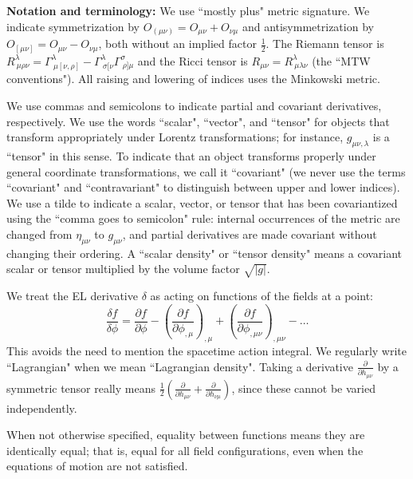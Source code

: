 \documentclass[aps,physrev,preprint,groupedaddress]{revtex4-2}
\begin{document}
\textbf{Notation and terminology:} We use ``mostly plus" metric signature.  We indicate symmetrization by \(O_{(\mu\nu)}=O_{\mu\nu}+O_{\nu\mu}\) and antisymmetrization by \(O_{[\mu\nu]}=O_{\mu\nu}-O_{\nu\mu}\), both without an implied factor \(\frac{1}{2}\).  The Riemann tensor is \(R_   {\ \mu\rho\nu}^\lambda=\Gamma_{\ \mu[\nu,\rho]}^\lambda-\Gamma_{\ \sigma[\nu}^\lambda \Gamma_{\ \rho]\mu}^\sigma\) and the Ricci tensor is \(R_{\mu\nu}=R_{\ \mu\lambda\nu}^\lambda\) (the ``MTW conventions"\cite{MTW}). All raising and lowering of indices uses the Minkowski metric. 

We use commas and semicolons to indicate partial and covariant derivatives, respectively. We use the words ``scalar", ``vector", and ``tensor" for objects that transform appropriately under Lorentz transformations; for instance, \(g_{\mu\nu,\lambda}\) is a ``tensor" in this sense. To indicate that an object transforms properly under general coordinate transformations, we call it ``covariant" (we never use the terms ``covariant" and ``contravariant" to distinguish between upper and lower indices). We use a tilde to indicate a scalar, vector, or tensor that has been covariantized using the ``comma goes to semicolon" rule: internal occurrences of the metric are changed from \(\eta_{\mu\nu}\) to \(g_{\mu\nu}\), and partial derivatives are made covariant without changing their ordering. A ``scalar density" or ``tensor density" means a covariant scalar or tensor multiplied by the volume factor \(\sqrt{|g|}\). 

We treat the EL derivative \(\delta\) as acting on functions of the fields at a point: 
\begin{equation}
\frac{\delta f}{\delta \phi}=\frac{\partial f}{\partial \phi}-{\left(\frac{\partial f}{\partial \phi_{,\mu}}\right)}_{,\mu}+{\left(\frac{\partial f}{\partial \phi_{,\mu\nu}}\right)}_{,\mu\nu}-\dots
\end{equation}
This avoids the need to mention the spacetime action integral. We regularly write ``Lagrangian" when we mean ``Lagrangian density". Taking a derivative \(\frac{\partial}{\partial h_{\mu\nu}}\) by a symmetric tensor really means \(\frac{1}{2}(\frac{\partial}{\partial h_{\mu\nu}}+\frac{\partial}{\partial h_{\nu\mu}})\), since these cannot be varied independently. 

When not otherwise specified, equality between functions means they are identically equal; that is, equal for all field configurations, even when the equations of motion are not satisfied. 
\end{document}
